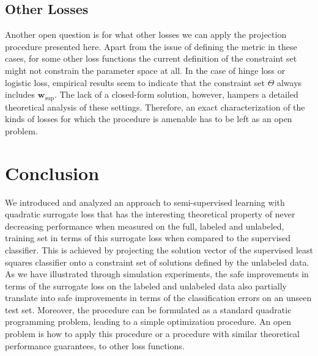 \documentclass[smallcondensed]{svjour3}\usepackage[]{graphicx}\usepackage[]{color}
\begin{document}
\subsection{Other Losses}
Another open question is for what other losses we can apply the projection procedure presented here. Apart from the issue of defining the metric in these cases, for some other loss functions the current definition of the constraint set might not constrain the parameter space at all. In the case of hinge loss or logistic loss, empirical results seem to indicate that the constraint set $\Theta$ always includes $\mathbf{w}_\mathrm{sup}$.  The lack of a closed-form solution, however, hampers a detailed theoretical analysis of these settings. Therefore, an exact characterization of the kinds of losses for which the procedure is amenable has to be left as an open problem.

\section{Conclusion}
We introduced and analyzed an approach to semi-supervised learning with quadratic surrogate loss that has the interesting theoretical property of never decreasing performance when measured on the full, labeled and unlabeled, training set in terms of this surrogate loss when compared to the supervised classifier. This is achieved by projecting the solution vector of the supervised least squares classifier onto a constraint set of solutions defined by the unlabeled data. As we have illustrated through simulation experiments, the safe improvements in terms of the surrogate loss on the labeled and unlabeled data also partially translate into safe improvements in terms of the classification errors on an unseen test set. Moreover, the procedure can be formulated as a standard quadratic programming problem, leading to a simple optimization procedure. An open problem is how to apply this procedure or a procedure with similar theoretical performance guarantees, to other loss functions.




\end{document}
